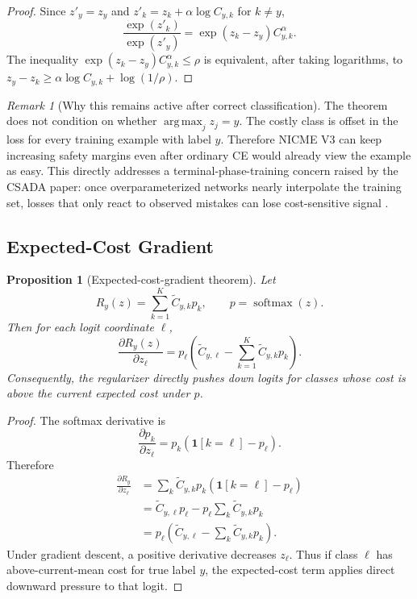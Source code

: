 \documentclass[11pt]{article}
\newcommand{\softmax}{\operatorname{softmax}}
\newcommand{\argmax}{\operatorname*{arg\,max}}
\newcommand{\I}{\mathbf{1}}
\theoremstyle{definition}
\theoremstyle{plain}
\newtheorem{proposition}{Proposition}
\theoremstyle{remark}
\newtheorem{remark}{Remark}
\begin{document}
\begin{proof}
Since $z'_y=z_y$ and $z'_k=z_k+\alpha\log C_{y,k}$ for $k\ne y$,
\begin{equation}
  \frac{\exp(z'_k)}{\exp(z'_y)}
  =
  \exp(z_k-z_y)C_{y,k}^{\alpha}.
\end{equation}
The inequality $\exp(z_k-z_y)C_{y,k}^{\alpha}\le\rho$ is equivalent, after
taking logarithms, to
$z_y-z_k\ge \alpha\log C_{y,k}+\log(1/\rho)$.
\end{proof}

\begin{remark}[Why this remains active after correct classification]
The theorem does not condition on whether $\argmax_j z_j=y$.
The costly class is offset in the loss for every training example with label $y$.
Therefore NICME V3 can keep increasing safety margins even after ordinary CE would already view the example as easy.
This directly addresses a terminal-phase-training concern raised by the CSADA paper: once overparameterized networks nearly interpolate the training set, losses that only react to observed mistakes can lose cost-sensitive signal \cite{chen2025csada}.
\end{remark}

\subsection{Expected-Cost Gradient}

\begin{proposition}[Expected-cost-gradient theorem]
Let
\begin{equation}
  R_y(z)=\sum_{k=1}^{K}\tilde C_{y,k}p_k,
  \qquad p=\softmax(z).
\end{equation}
Then for each logit coordinate $\ell$,
\begin{equation}
  \frac{\partial R_y(z)}{\partial z_\ell}
  =
  p_\ell
  \left(
    \tilde C_{y,\ell}
    -
    \sum_{k=1}^{K}\tilde C_{y,k}p_k
  \right).
  \label{eq:expected-cost-gradient}
\end{equation}
Consequently, the regularizer directly pushes down logits for classes whose cost is above the current expected cost under $p$.
\end{proposition}

\begin{proof}
The softmax derivative is
\begin{equation}
  \frac{\partial p_k}{\partial z_\ell}
  =
  p_k(\I[k=\ell]-p_\ell).
\end{equation}
Therefore
\begin{align}
  \frac{\partial R_y}{\partial z_\ell}
  &=
  \sum_k \tilde C_{y,k}
  p_k(\I[k=\ell]-p_\ell)
  \nonumber\\
  &=
  \tilde C_{y,\ell}p_\ell
  -
  p_\ell\sum_k \tilde C_{y,k}p_k
  \nonumber\\
  &=
  p_\ell
  \left(
    \tilde C_{y,\ell}
    -
    \sum_k \tilde C_{y,k}p_k
  \right).
\end{align}
Under gradient descent, a positive derivative decreases $z_\ell$.
Thus if class $\ell$ has above-current-mean cost for true label $y$, the expected-cost term applies direct downward pressure to that logit.
\end{proof}
\end{document}
